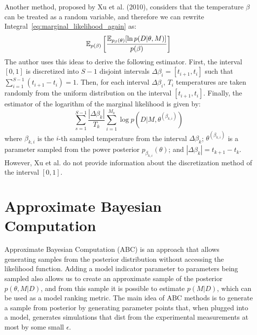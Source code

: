 Another method, proposed by Xu et al. (2010), considers that the 
temperature $\beta$ can be treated as a random variable, and therefore 
we can rewrite Integral~\ref{eq:marginal_likelihood_again} as:
\begin{equation}
    \mathbb{E}_{p (\beta)} 
        \left[\frac
            {\mathbb{E}_{p_\beta (\theta)}[\ln p(D|\theta, M)]}
            {p (\beta)}
        \right]
\end{equation}
The author uses this ideas to derive the following estimator. First, 
the interval $[0, 1]$ is discretized into $S - 1$ disjoint intervals 
$\Delta\beta_i = [t_{i + 1}, t_i]$ such that  $\sum_{i = 1}^{S - 1} 
(t_{i + 1} - t_{i}) = 1$. Then, for each interval $\Delta\beta_i$, $T_i$ 
temperatures are taken randomly from the uniform distribution on the 
interval $[t_{i + 1}, t_i]$. Finally, the estimator of the logarithm of
the marginal likelihood is given by:
\begin{equation}
    \sum_{s = 1}^{S - 1}\frac{|\Delta\beta_k|}
                             {T_k}
        \sum_{i = 1}^{M_k} \log p (D | M, \theta^{(\beta_{k, i})})
\end{equation}
where $\beta_{k, i}$ is the $i$-th sampled temperature from the interval
$\Delta\beta_k$; $\theta^{(\beta_{k, i})}$ is a parameter sampled 
from the power posterior $p_{\beta_{k, i}} (\theta)$; and 
$|\Delta\beta_k| = t_{k + 1} - t_k$. However, Xu et al. do not provide
information about the discretization method of the interval $[0, 1]$.


\section{Approximate Bayesian Computation}
\label{sec:abc_method}
Approximate Bayesian Computation (ABC) is an approach that allows 
generating samples from the posterior distribution without accessing the
likelihood function. Adding a model indicator parameter to parameters 
being sampled also allows us to create an approximate sample of the 
posterior $p (\theta, M | D)$, and from this sample it is possible to 
estimate $p (M | D)$, which can be used as a model ranking metric. The 
main idea of ABC methods is to generate a sample from posterior by 
generating parameter points that, when plugged into a model, generates 
simulations that dist from the experimental measurements at most by some
small $\epsilon$.

